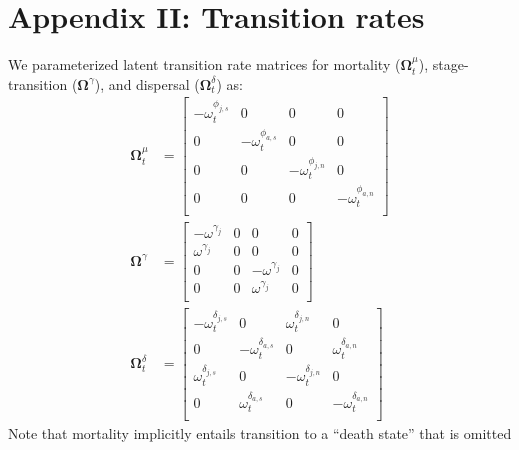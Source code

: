 \documentclass[11pt]{article}
\begin{document}
\section*{Appendix II: Transition rates} 

We parameterized latent transition rate matrices for mortality ($\boldsymbol\Omega^{\mu}_t$), 
stage-transition ($\boldsymbol\Omega^{\gamma}$), 
and dispersal ($\boldsymbol\Omega^{\delta}_t$) as:
\begin{equation} \label{eq:Theta}
\begin{aligned}
\boldsymbol\Omega^{\mu}_t & = 
\left[
\begin{array}{cc|cc}
    -\omega^{\phi_{j,s}}_t & 0 & 0 & 0 \\
    0 & -\omega^{\phi_{a,s}}_t & 0 & 0 \\
    \hline
    0 & 0 & -\omega^{\phi_{j,n}}_t & 0 \\
    0 & 0 & 0 & -\omega^{\phi_{a,n}}_t \\
    \end{array}
\right] \\
\boldsymbol\Omega^{\gamma} & = 
\left[
\begin{array}{cc|cc}
    -\omega^{\gamma_{j}} & 0 & 0 & 0 \\
    \omega^{\gamma_{j}}  & 0 & 0 & 0 \\
    \hline
    0 & 0 & -\omega^{\gamma_{j}} & 0 \\
    0 & 0 & \omega^{\gamma_{j}}  & 0 \\
    \end{array}
\right] \\
\boldsymbol\Omega^{\delta}_t & = 
\left[
\begin{array}{cc|cc}
    -\omega^{\delta_{j,s}}_t & 0 & \omega^{\delta_{j,n}}_t & 0 \\
    0 & -\omega^{\delta_{a,s}}_t & 0 & \omega^{\delta_{a,n}}_t \\
    \hline
    \omega^{\delta_{j,s}}_t & 0 & -\omega^{\delta_{j,n}}_t & 0 \\
    0 & \omega^{\delta_{a,s}}_t & 0 & -\omega^{\delta_{a,n}}_t \\
    \end{array}
\right]
\end{aligned}
\end{equation}
%
Note that mortality implicitly entails transition to a ``death state'' that is omitted 
\end{document}
